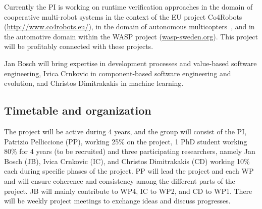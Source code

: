 \documentclass[12pt]{article}
\newcommand{\nb}[2]{
    \fcolorbox{gray}{yellow}{\bfseries\sffamily\scriptsize#1}
    {\sf\small$\blacktriangleright$\textit{#2}$\blacktriangleleft$}
   }
\newcommand{\nb}[2]{}
\newcommand\patrizio[1]{\nb{Patrizio}{#1}}
\begin{document}
Currently the PI is working on runtime verification approaches in the domain of cooperative multi-robot systems in the context of the EU project Co4Robots ({\small \url{http://www.co4robots.eu/}}), in the domain of 
autonomous multicopters~\cite{ASE2015}, and in the automotive domain within the WASP project ({\small \url{wasp-sweden.org}}). This project will be profitably connected with these projects. %

Jan Bosch will bring expertise in development processes and value-based software engineering, Ivica Crnkovic in component-based software engineering and evolution, and Christos Dimitrakakis in machine learning. 

\vspace{-.2cm}
\subsection{Timetable and organization}
\vspace{-.2cm}
The \name{} project will be active during 4 years, and the group will consist of the PI, Patrizio Pelliccione (PP), working
25\% on the project, 1 PhD student working 80\%  for 4 years (to be recruited) and three participating researchers, namely Jan Bosch (JB), Ivica Crnkovic (IC), and Christos Dimitrakakis (CD) working 10\% each during specific phases of the project.  PP will lead the project and each WP and will ensure coherence and consistency among the different parts of the project. JB will mainly contribute to WP4, IC to WP2, and CD to WP1. There will be weekly project meetings to exchange ideas and discuss progresses.
\end{document}
